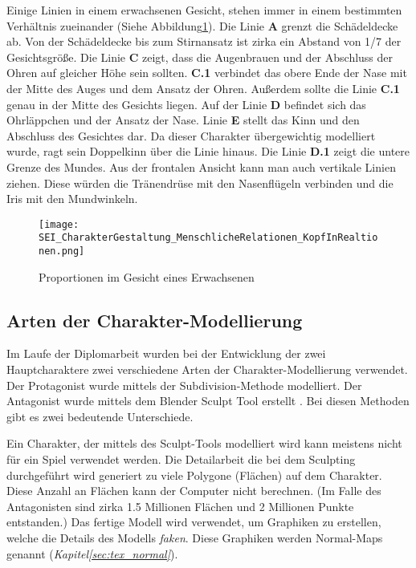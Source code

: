 Einige Linien in einem erwachsenen Gesicht, stehen immer in einem bestimmten Verhältnis zueinander
(Siehe Abbildung\ref{blender:proportions}). Die Linie \textbf{A} grenzt die Schädeldecke ab. Von
der Schädeldecke bis zum Stirnansatz ist zirka ein Abstand von 1/7 der Gesichtsgröße. Die Linie
\textbf{C} zeigt, dass die Augenbrauen und der Abschluss der Ohren auf gleicher Höhe sein sollten.
\textbf{C.1} verbindet das obere Ende der Nase mit der Mitte des Auges und dem Ansatz der Ohren.
Außerdem sollte die Linie  \textbf{C.1} genau in der Mitte des Gesichts liegen. Auf der Linie
\textbf{D} befindet sich das Ohrläppchen und der Ansatz der Nase. Linie  \textbf{E} stellt das Kinn
und den Abschluss des Gesichtes dar. Da dieser Charakter übergewichtig modelliert wurde, ragt sein
Doppelkinn über die Linie hinaus. Die Linie  \textbf{D.1} zeigt die untere Grenze des Mundes.
Aus der frontalen Ansicht kann man auch vertikale Linien ziehen. Diese würden die Tränendrüse mit den Nasenflügeln
verbinden und die Iris mit den Mundwinkeln.\citep{book:kunst_des_zeichnens}
\begin{figure}[h]
    \centering
    \texttt{[image: SEI\_CharakterGestaltung\_MenschlicheRelationen\_KopfInRealtionen.png]}
    \caption{Proportionen im Gesicht eines Erwachsenen}
    \label{blender:proportions}
\end{figure}

\subsection{Arten der Charakter-Modellierung}
Im Laufe der Diplomarbeit wurden bei der Entwicklung der zwei Hauptcharaktere zwei verschiedene Arten der
Charakter-Modellierung verwendet. Der Protagonist wurde mittels der Subdivision-Methode modelliert. Der Antagonist
wurde mittels dem Blender Sculpt Tool\citep{blender:sculpting_general} erstellt .
Bei diesen Methoden gibt es zwei bedeutende Unterschiede.


Ein Charakter, der mittels des Sculpt-Tools modelliert wird kann meistens nicht für ein Spiel verwendet werden. Die
Detailarbeit die bei dem Sculpting durchgeführt wird generiert zu viele Polygone (Flächen) auf dem Charakter. Diese
Anzahl an Flächen kann der Computer nicht berechnen. (Im Falle des Antagonisten sind zirka 1.5 Millionen Flächen und 2
Millionen Punkte entstanden.) Das fertige Modell wird verwendet, um Graphiken zu erstellen, welche die Details des
Modells \textit{faken}. Diese Graphiken werden Normal-Maps genannt (\textit{Kapitel\ref{sec:tex_normal}}).

